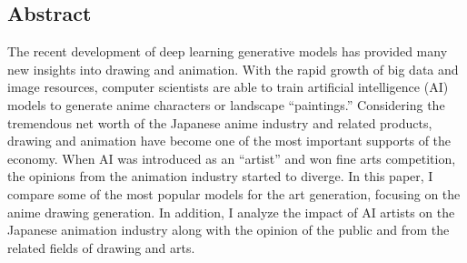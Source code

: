 \subsection*{Abstract}
The recent development of deep learning generative models has provided many new insights into drawing and animation.
With the rapid growth of big data and image resources, computer scientists are able to train artificial intelligence (AI) models to generate anime characters or landscape ``paintings.'' 
Considering the tremendous net worth of the Japanese anime industry and related products, drawing and animation have become one of the most important supports of the economy.
When AI was introduced as an “artist” and won fine arts competition, the opinions from the animation industry started to diverge.
In this paper, I compare some of the most popular models for the art generation, focusing on the anime drawing generation.
In addition, I analyze the impact of AI artists on the Japanese animation industry along with the opinion of the public and from the related fields of drawing and arts.

